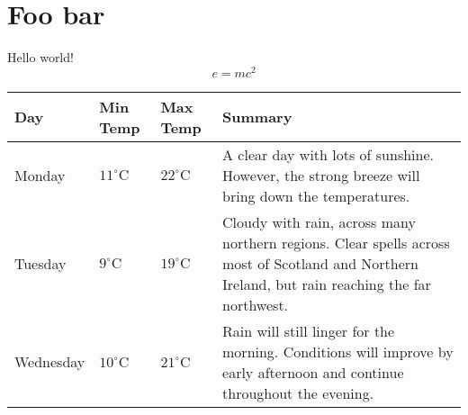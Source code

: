 \documentclass[table,color,cover]{fithesis3/fithesis3}
\begin{document}
  \chapter{Foo bar}
  Hello world!
  \begin{equation}
    \tag{Mass--energy equivalence} e=mc^2
  \end{equation}
  \begin{center}
    \begin{tabularx}{\textwidth}{lllX}
    \toprule
    Day & Min Temp & Max Temp & Summary \\
    \midrule
    Monday & $11^{\circ}\mathrm{C}$ & $22^\circ\mathrm{C}$ & A
    clear day with lots of sunshine. However, the strong breeze
    will bring down the temperatures. \\
    Tuesday & $9^{\circ}\mathrm{C}$ & $19^\circ\mathrm{C}$ & Cloudy
    with rain, across many northern regions. Clear spells across
    most of Scotland and Northern Ireland, but rain reaching the
    far northwest. \\
    Wednesday & $10^{\circ}\mathrm{C}$ &
    $21^\circ\mathrm{C}$ & Rain will still linger for the morning.
    Conditions will improve by early afternoon and continue
    throughout the evening.\\
    \bottomrule
    \end{tabularx}
  \end{center}
\end{document}
